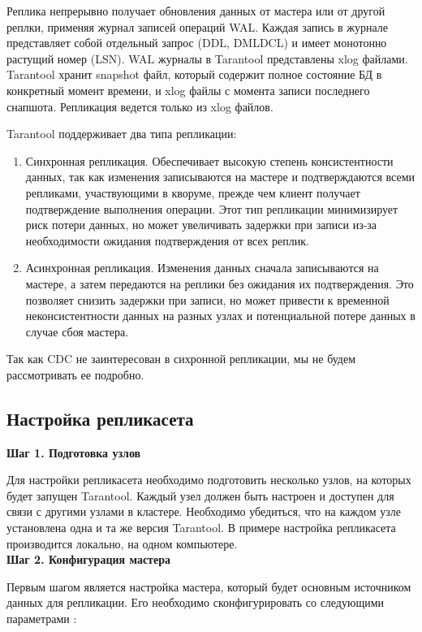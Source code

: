 Реплика непрерывно получает обновления данных от мастера или от другой реплки, применяя журнал записей операций WAL. Каждая запись в журнале представляет собой отдельный запрос (DDL, DMLDCL) и имеет монотонно растущий номер (LSN). WAL журналы в Tarantool представлены xlog файлами. Tarantool хранит snapshot файл, который содержит полное состояние БД в конкретный момент времени, и xlog файлы с момента записи последнего снапшота. Репликация ведется только из xlog файлов.

Tarantool поддерживает два типа репликации:

\begin{enumerate}
    \item Синхронная репликация. Обеспечивает высокую степень консистентности данных, так как изменения записываются на мастере и подтверждаются всеми репликами, участвующими в кворуме, прежде чем клиент получает подтверждение выполнения операции. Этот тип репликации минимизирует риск потери данных, но может увеличивать задержки при записи из-за необходимости ожидания подтверждения от всех реплик.
    \item Асинхронная репликация. Изменения данных сначала записываются на мастере, а затем передаются на реплики без ожидания их подтверждения. Это позволяет снизить задержки при записи, но может привести к временной неконсистентности данных на разных узлах и потенциальной потере данных в случае сбоя мастера.
\end{enumerate}

Так как CDC не заинтересован в сихронной репликации, мы не будем рассмотривать ее подробно.


\subsection{Настройка репликасета}

\textbf{Шаг 1. Подготовка узлов}

Для настройки репликасета необходимо подготовить несколько узлов, на которых будет запущен Tarantool. Каждый узел должен быть настроен и доступен для связи с другими узлами в кластере. Необходимо убедиться, что на каждом узле установлена одна и та же версия Tarantool. В примере настройка репликасета производится локально, на одном компьютере. \\

\textbf{Шаг 2. Конфигурация мастера}

Первым шагом является настройка мастера, который будет основным источником данных для репликации. Его необходимо сконфигурировать со следующими параметрами \cite{TarantoolDoc}:

